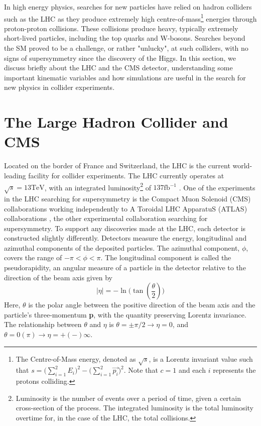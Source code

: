 In high energy physics, searches for new particles have relied on hadron colliders such as the LHC as they produce extremely high centre-of-mass\footnote{The Centre-of-Mass energy, denoted as $\sqrt{s}$, is a Lorentz invariant value such that $s=\Big( \sum\limits_{i=1}^2 E_i \Big)^2 - \Big( \sum\limits_{i=1}^2 \overrightarrow{p_i} \Big)^2 $. Note that $c=1$ and each $i$ represents the protons colliding.} energies through proton-proton collisions. These collisions produce heavy, typically extremely short-lived particles, including the top quarks and W-bosons. Searches beyond the SM proved to be a  challenge, or rather "unlucky", at such colliders, with no signs of supersymmetry since the discovery of the Higgs. In this section, we discuss briefly about the LHC and the CMS detector, understanding some important kinematic variables and how simulations are useful in the search for new physics in collider experiments.

\section{The Large Hadron Collider and CMS}
\label{sec:Detector}
Located on the border of France and Switzerland, the LHC is the current world-leading facility for collider experiments. The LHC currently operates at $ \sqrt{s}=13 \text{TeV} $, with an integrated luminosity\footnote{Luminosity is the number of events over a period of time, given a certain cross-section of the process. The integrated luminosity is the total luminosity overtime for, in the case of the LHC, the total collisions.} of $137\text{fb}^{-1}$ \cite{cms2019search}. One of the experiments in the LHC searching for supersymmetry is the Compact Muon Solenoid (CMS) collaborations \cite{chatrchyan2008cms} working independently to A Toroidal LHC ApparatuS (ATLAS) collaborations \cite{collaboration2008atlas}, the other experimental collaboration searching for supersymmetry.  To support any discoveries made at the LHC, each detector is constructed slightly differently. Detectors measure the energy, longitudinal and azimuthal components of the deposited particles. The azimuthal component, $\phi$, covers the range of $-\pi < \phi < \pi$. The longitudinal component is called the pseudorapidity, an angular measure of a particle in the detector relative to the direction of the beam axis given by
\begin{equation}
    |\eta|=-\ln\Big(\tan(\frac{\theta}{2})\Big)
    \label{eq:eta}
\end{equation}
Here, $\theta$ is the polar angle between the positive direction of the beam axis and the particle's three-momentum \textbf{p}, with the quantity preserving Lorentz invariance. The relationship between $\theta$ and $\eta$ is $\theta = \pm \pi/2 \rightarrow \eta = 0$, and $\theta = 0(\pi) \rightarrow \eta = +(-) \infty$. \\

